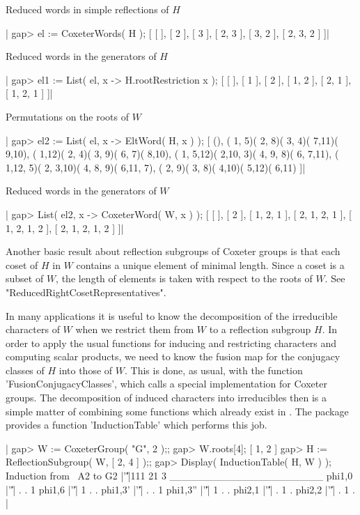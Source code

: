 Reduced words in simple reflections of $H$\:

|    gap> el := CoxeterWords( H );
    [ [  ], [ 2 ], [ 3 ], [ 2, 3 ], [ 3, 2 ], [ 2, 3, 2 ] ]|

Reduced words in the generators of $H$\:

|    gap> el1 := List( el, x -> H.rootRestriction{ x } );
    [ [  ], [ 1 ], [ 2 ], [ 1, 2 ], [ 2, 1 ], [ 1, 2, 1 ] ]|

Permutations on the roots of $W$\:

|    gap> el2 := List( el, x -> EltWord( H, x ) );
    [ (), ( 1, 5)( 2, 8)( 3, 4)( 7,11)( 9,10),
      ( 1,12)( 2, 4)( 3, 9)( 6, 7)( 8,10),
      ( 1, 5,12)( 2,10, 3)( 4, 9, 8)( 6, 7,11),
      ( 1,12, 5)( 2, 3,10)( 4, 8, 9)( 6,11, 7),
      ( 2, 9)( 3, 8)( 4,10)( 5,12)( 6,11) ]|

Reduced words in the generators of $W$\:

|    gap> List( el2, x -> CoxeterWord( W, x ) );
    [ [  ], [ 2 ], [ 1, 2, 1 ], [ 2, 1, 2, 1 ], [ 1, 2, 1, 2 ],
      [ 2, 1, 2, 1, 2 ] ]|

Another  basic  result  about  reflection subgroups  of  Coxeter  groups
is  that  each  coset  of  $H$  in $W$  contains  a  unique  element  of
minimal  length.  Since  a  coset  is   a  subset  of  $W$,  the  length
of  elements   is  taken  with  respect   to  the  roots  of   $W$.  See
"ReducedRightCosetRepresentatives".


In  many  applications  it  is  useful  to  know  the  decomposition  of
the  irreducible  characters of  $W$  when  we  restrict them  from  $W$
to  a reflection  subgroup  $H$.  In order  to  apply  the usual  {\GAP}
functions for  inducing and restricting characters  and computing scalar
products, we  need to know the  fusion map for the  conjugacy classes of
$H$  into  those  of $W$.  This  is  done,  as  usual, with  the  {\GAP}
function 'FusionConjugacyClasses', which  calls a special implementation
for  Coxeter  groups.  The  decomposition  of  induced  characters  into
irreducibles then is  a simple matter of combining  some functions which
already  exist in  {\GAP}.  The package  {\CHEVIE}  provides a  function
'InductionTable' which performs this job.

|    gap> W := CoxeterGroup( "G", 2 );;
    gap> W.roots[4];
    [ 1, 2 ]
    gap> H := ReflectionSubgroup( W, [ 2, 4 ] );;
    gap> Display( InductionTable( H, W ) );
    Induction from ~A2 to G2
               |'\|'|111 21 3
    _____________________
    phi{1,0}   |'\|'|  .  . 1
    phi{1,6}   |'\|'|  1  . .
    phi{1,3}'  |'\|'|  .  . 1
    phi{1,3}'' |'\|'|  1  . .
    phi{2,1}   |'\|'|  .  1 .
    phi{2,2}   |'\|'|  .  1 . |

